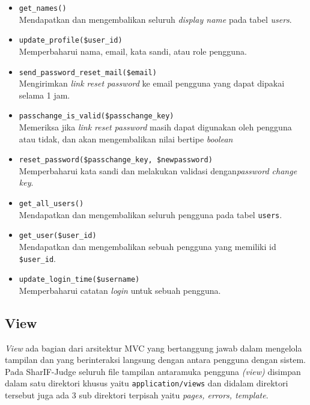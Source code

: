\begin{itemize}
\begin{itemize}
		      \item \verb|get_names()| \\
		            Mendapatkan dan mengembalikan seluruh \textit{display name} pada tabel \textit{users}.
		      \item \verb|update_profile($user_id)| \\
		            Memperbaharui nama, email, kata sandi, atau role pengguna.
		      \item \verb|send_password_reset_mail($email)| \\
		            Mengirimkan \textit{link reset password} ke email pengguna yang dapat dipakai selama 1 jam.
		      \item \verb|passchange_is_valid($passchange_key)| \\
					Memeriksa jika \textit{link reset password} masih dapat digunakan oleh pengguna atau tidak, dan akan mengembalikan nilai bertipe \textit{boolean}
		      \item \verb|reset_password($passchange_key, $newpassword)| \\
		            Memperbaharui kata sandi dan melakukan validasi dengan\textit{password change key}.
		      \item \verb|get_all_users()| \\
		            Mendapatkan dan mengembalikan seluruh pengguna pada tabel \verb|users|.
		      \item \verb|get_user($user_id)| \\
		            Mendapatkan dan mengembalikan sebuah pengguna yang memiliki id \verb|$user_id|.
		      \item \verb|update_login_time($username)| \\
		            Memperbaharui catatan \textit{login} untuk sebuah pengguna.
	      \end{itemize}
\end{itemize}

\subsection{View}
\textit{View} ada bagian dari arsitektur MVC yang bertanggung jawab dalam mengelola tampilan dan yang berinteraksi langsung dengan antara pengguna dengan sistem. Pada SharIF-Judge seluruh file tampilan antaramuka pengguna \textit{(view)} disimpan dalam satu direktori khusus yaitu \verb|application/views| dan didalam direktori tersebut juga ada 3 sub direktori terpisah yaitu \textit{pages, errors, template}.

